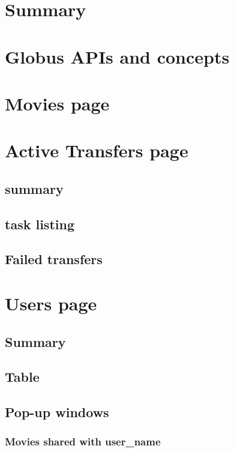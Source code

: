 \documentclass{report}
\begin{document}
\maketitle
\tableofcontents

\chapter{Summary}


\chapter{Globus APIs and concepts}


\chapter{Movies page}


\chapter{Active Transfers page}
\section{summary}
\section{task listing}
\section{Failed transfers}

\chapter{Users page}
\section{Summary}
\section{Table}
\section{Pop-up windows}
\subsection{Movies shared with user\_name}
\end{document}
